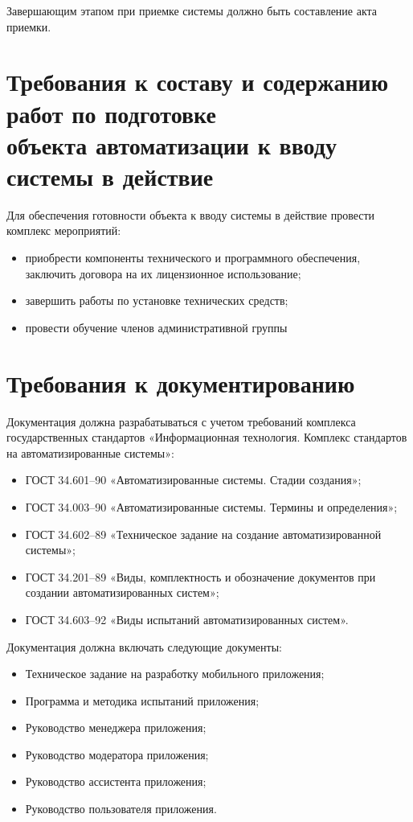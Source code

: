 \documentclass[14pt]{extreport}
\begin{document}
Завершающим этапом при приемке системы должно быть составление акта приемки.


\chapter{Требования к составу и содержанию работ по подготовке \\
объекта автоматизации к вводу системы в действие}
Для обеспечения готовности объекта к вводу системы в действие провести комплекс мероприятий:
\begin{itemize}
	\item приобрести компоненты технического и программного обеспечения, заключить договора на их лицензионное использование;
	\item завершить работы по установке технических средств;
	\item провести обучение членов административной группы
\end{itemize}


\chapter{Требования к документированию}
Документация должна разрабатываться с учетом требований комплекса государственных стандартов «Информационная технология. Комплекс стандартов на автоматизированные системы»:
\begin{itemize}
	\item ГОСТ 34.601–90 «Автоматизированные системы. Стадии создания»;
	\item ГОСТ 34.003–90 «Автоматизированные системы. Термины и определения»;
	\item ГОСТ 34.602–89 «Техническое задание на создание автоматизированной системы»;
	\item ГОСТ 34.201–89 «Виды, комплектность и обозначение документов при создании автоматизированных систем»;
	\item ГОСТ 34.603–92 «Виды испытаний автоматизированных систем».
\end{itemize}

Документация должна включать следующие документы:
\begin{itemize}
	\item Техническое задание на разработку мобильного приложения;
	\item Программа и методика испытаний приложения;
	\item Руководство менеджера приложения;
	\item Руководство модератора приложения;
	\item Руководство ассистента приложения;
	\item Руководство пользователя приложения.
\end{itemize}
\end{document}

